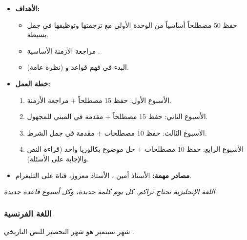 \documentclass[12pt,a4paper]{book}
\newcommand{\quoteAr}[1]{%
	\begin{myquote}
		\itshape #1
	\end{myquote}
}
\begin{document}
	\begin{itemize}
		\item \textbf{الأهداف:}
		\begin{itemize}
			\item حفظ 50 مصطلحاً أساسياً من الوحدة الأولى مع ترجمتها وتوظيفها في جمل بسيطة.
			\item مراجعة الأزمنة الأساسية .
			\item البدء في فهم قواعد  و (نظرة عامة).
		\end{itemize}
		\item \textbf{خطة العمل:}
		\begin{enumerate}
			\item الأسبوع الأول: حفظ 15 مصطلحاً + مراجعة الأزمنة.
			\item الأسبوع الثاني: حفظ 15 مصطلحاً + مقدمة في المبني للمجهول.
			\item الأسبوع الثالث: حفظ 10 مصطلحات + مقدمة في جمل الشرط.
			\item الأسبوع الرابع: حفظ 10 مصطلحات + حل موضوع بكالوريا واحد (قراءة النص والإجابة على الأسئلة).
		\end{enumerate}
		\item \textbf{مصادر مهمة:} الأستاذ أمين ، الأستاذ معزوز، قناة  على التليغرام.
	\end{itemize}
	
	\quoteAr{اللغة الإنجليزية تحتاج تراكم. كل يوم كلمة جديدة، وكل أسبوع قاعدة جديدة.}
	
	\subsubsection{اللغة الفرنسية}
	
	شهر سبتمبر هو شهر التحضير للنص التاريخي .
	
\end{document}
